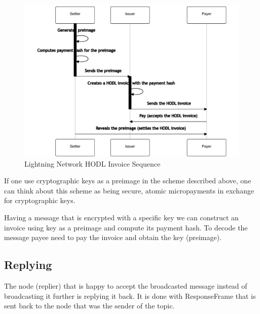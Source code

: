 \documentclass{article}
\begin{document}
\begin{figure}
	\centering
	\includegraphics[scale=0.6]{LNDSequence.pdf}
	\caption{Lightning Network HODL Invoice Sequence}
	\label{fig:fr:lndsequence}
\end{figure}

If one use cryptographic keys as a preimage in the scheme described above, one can think about this scheme as being secure, atomic micropayments in exchange for cryptographic keys.

Having a message that is encrypted with a specific key we can construct an invoice using key as a preimage and compute its payment hash. To decode the message payee need to pay the invoice and obtain the key (preimage).

\subsection{Replying}
The node (replier) that is happy to accept the broadcasted message instead of broadcasting it further is replying it back. It is done with ResponseFrame that is sent back to the node that was the sender of the topic.
\end{document}

